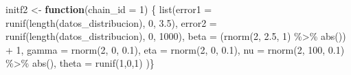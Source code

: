 \documentclass[
]{article}
\newenvironment{Shaded}{\begin{snugshade}}{\end{snugshade}}
\newcommand{\AttributeTok}[1]{\textcolor[rgb]{0.77,0.63,0.00}{#1}}
\newcommand{\ControlFlowTok}[1]{\textcolor[rgb]{0.13,0.29,0.53}{\textbf{#1}}}
\newcommand{\DecValTok}[1]{\textcolor[rgb]{0.00,0.00,0.81}{#1}}
\newcommand{\FloatTok}[1]{\textcolor[rgb]{0.00,0.00,0.81}{#1}}
\newcommand{\FunctionTok}[1]{\textcolor[rgb]{0.00,0.00,0.00}{#1}}
\newcommand{\NormalTok}[1]{#1}
\newcommand{\OtherTok}[1]{\textcolor[rgb]{0.56,0.35,0.01}{#1}}
\newcommand{\SpecialCharTok}[1]{\textcolor[rgb]{0.00,0.00,0.00}{#1}}
\begin{document}
\begin{Shaded}
\begin{Highlighting}[]
\NormalTok{initf2 }\OtherTok{\textless{}{-}} \ControlFlowTok{function}\NormalTok{(}\AttributeTok{chain\_id =} \DecValTok{1}\NormalTok{) \{}
  \FunctionTok{list}\NormalTok{(}\AttributeTok{error1       =} \FunctionTok{runif}\NormalTok{(}\FunctionTok{length}\NormalTok{(datos\_distribucion), }\DecValTok{0}\NormalTok{, }\FloatTok{3.5}\NormalTok{), }
       \AttributeTok{error2       =} \FunctionTok{runif}\NormalTok{(}\FunctionTok{length}\NormalTok{(datos\_distribucion), }\DecValTok{0}\NormalTok{, }\DecValTok{1000}\NormalTok{), }
       \AttributeTok{beta         =}\NormalTok{ (}\FunctionTok{rnorm}\NormalTok{(}\DecValTok{2}\NormalTok{, }\FloatTok{2.5}\NormalTok{, }\DecValTok{1}\NormalTok{) }\SpecialCharTok{\%\textgreater{}\%} \FunctionTok{abs}\NormalTok{()) }\SpecialCharTok{+} \DecValTok{1}\NormalTok{,}
       \AttributeTok{gamma        =} \FunctionTok{rnorm}\NormalTok{(}\DecValTok{2}\NormalTok{, }\DecValTok{0}\NormalTok{, }\FloatTok{0.1}\NormalTok{),}
       \AttributeTok{eta          =} \FunctionTok{rnorm}\NormalTok{(}\DecValTok{2}\NormalTok{, }\DecValTok{0}\NormalTok{, }\FloatTok{0.1}\NormalTok{),}
       \AttributeTok{nu           =} \FunctionTok{rnorm}\NormalTok{(}\DecValTok{2}\NormalTok{, }\DecValTok{100}\NormalTok{, }\FloatTok{0.1}\NormalTok{) }\SpecialCharTok{\%\textgreater{}\%} \FunctionTok{abs}\NormalTok{(),}
       \AttributeTok{theta        =} \FunctionTok{runif}\NormalTok{(}\DecValTok{1}\NormalTok{,}\DecValTok{0}\NormalTok{,}\DecValTok{1}\NormalTok{)}
\NormalTok{  )\}}


\end{Highlighting}
\end{Shaded}
\end{document}
